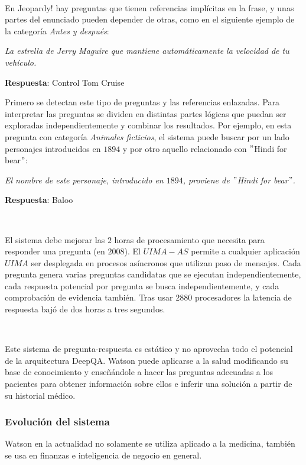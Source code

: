 \documentclass[paper=a4, fontsize=10pt]{scrartcl} %
\numberwithin{equation}{section} %
\numberwithin{figure}{section} %
\numberwithin{table}{section} %
\begin{document}
\

En Jeopardy! hay preguntas que tienen referencias implícitas en la frase, y unas partes del enunciado pueden depender de otras, como en el siguiente ejemplo de la categoría \textit{Antes y después}:

\begin{center}
\textit{La estrella de Jerry Maguire que mantiene automáticamente la velocidad de tu vehículo.}

\textbf{Respuesta}: Control Tom Cruise
\end{center} 

Primero se detectan este tipo de preguntas y las referencias enlazadas.
Para interpretar las preguntas se dividen en distintas partes lógicas que puedan ser exploradas independientemente y combinar los resultados. %
Por ejemplo, en esta pregunta con categoría \textit{Animales ficticios}, el sistema puede buscar por un lado personajes introducidos en $1894$ y por otro aquello relacionado con $"$Hindi for bear$"$:

\begin{center}
\textit{El nombre de este personaje, introducido en $1894$, proviene de $"$Hindi for bear$"$.}

\textbf{Respuesta}: Baloo
\end{center}

\

El sistema debe mejorar las $2$ horas de procesamiento que necesita para responder una pregunta (en $2008$).
El $UIMA-AS$ permite a cualquier aplicación $UIMA$ ser desplegada en  procesos asíncronos que utilizan paso de mensajes.
Cada pregunta genera varias preguntas candidatas que se ejecutan independientemente, cada respuesta potencial por pregunta se busca independientemente, y cada comprobación de evidencia también.
Tras usar $2880$ procesadores la latencia de respuesta bajó de dos horas a tres segundos. %

\

Este sistema de pregunta-respuesta es estático y no aprovecha todo el potencial de la arquitectura DeepQA.
Watson puede aplicarse a la salud modificando su base de conocimiento y enseñándole a hacer las preguntas adecuadas a los pacientes para obtener información sobre ellos e inferir una solución a partir de su historial médico.

\subsubsection{Evolución del sistema}
Watson en la actualidad no solamente se utiliza aplicado a la medicina, también se usa en finanzas e inteligencia de negocio en general.
\end{document}
